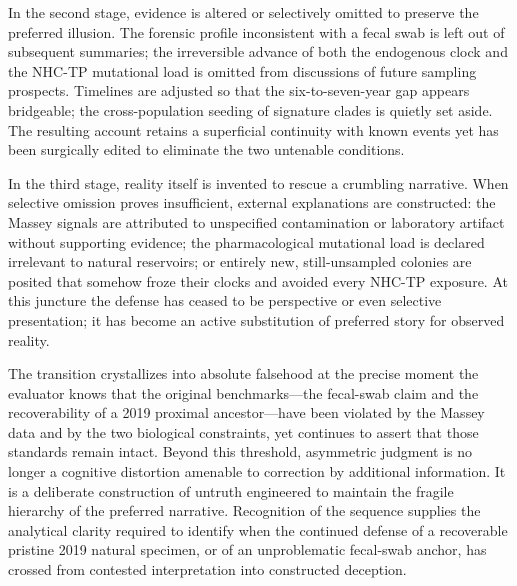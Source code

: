 In the second stage, evidence is altered or selectively omitted to preserve the preferred illusion. The forensic profile inconsistent with a fecal swab is left out of subsequent summaries; the irreversible advance of both the endogenous clock and the NHC-TP mutational load is omitted from discussions of future sampling prospects. Timelines are adjusted so that the six-to-seven-year gap appears bridgeable; the cross-population seeding of signature clades is quietly set aside. The resulting account retains a superficial continuity with known events yet has been surgically edited to eliminate the two untenable conditions.

In the third stage, reality itself is invented to rescue a crumbling narrative. When selective omission proves insufficient, external explanations are constructed: the Massey signals are attributed to unspecified contamination or laboratory artifact without supporting evidence; the pharmacological mutational load is declared irrelevant to natural reservoirs; or entirely new, still-unsampled colonies are posited that somehow froze their clocks and avoided every NHC-TP exposure. At this juncture the defense has ceased to be perspective or even selective presentation; it has become an active substitution of preferred story for observed reality.

The transition crystallizes into absolute falsehood at the precise moment the evaluator knows that the original benchmarks—the fecal-swab claim and the recoverability of a 2019 proximal ancestor—have been violated by the Massey data and by the two biological constraints, yet continues to assert that those standards remain intact. Beyond this threshold, asymmetric judgment is no longer a cognitive distortion amenable to correction by additional information. It is a deliberate construction of untruth engineered to maintain the fragile hierarchy of the preferred narrative. Recognition of the sequence supplies the analytical clarity required to identify when the continued defense of a recoverable pristine 2019 natural specimen, or of an unproblematic fecal-swab anchor, has crossed from contested interpretation into constructed deception.
